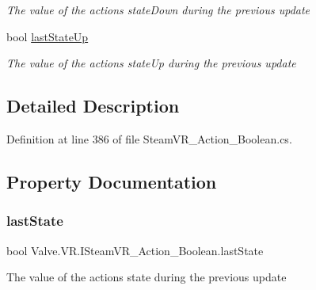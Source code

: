 \begin{DoxyCompactItemize}
\begin{DoxyCompactList}\small\item\em The value of the action\textquotesingle{}s \textquotesingle{}state\+Down\textquotesingle{} during the previous update \end{DoxyCompactList}\item 
bool \mbox{\hyperlink{interface_valve_1_1_v_r_1_1_i_steam_v_r___action___boolean_a86e9cd96c0f19eadfe03b79a33c4e7f4}{last\+State\+Up}}
\begin{DoxyCompactList}\small\item\em The value of the action\textquotesingle{}s \textquotesingle{}state\+Up\textquotesingle{} during the previous update \end{DoxyCompactList}\end{DoxyCompactItemize}


\subsection{Detailed Description}


Definition at line 386 of file Steam\+V\+R\+\_\+\+Action\+\_\+\+Boolean.\+cs.



\subsection{Property Documentation}
\mbox{\label{interface_valve_1_1_v_r_1_1_i_steam_v_r___action___boolean_a6b33097be2986b6ab9e7db94f771bfc4}} 
\subsubsection{\texorpdfstring{lastState}{lastState}}
{\footnotesize\ttfamily bool Valve.\+V\+R.\+I\+Steam\+V\+R\+\_\+\+Action\+\_\+\+Boolean.\+last\+State\hspace{0.3cm}{\ttfamily [get]}}



The value of the action\textquotesingle{}s \textquotesingle{}state\textquotesingle{} during the previous update 

